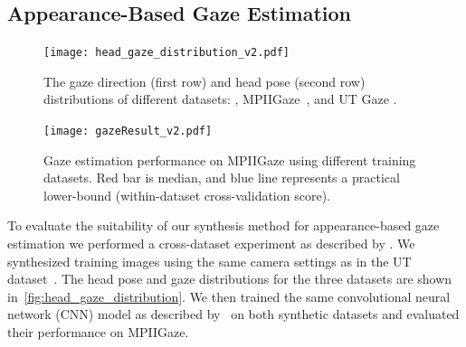 
\subsection{Appearance-Based Gaze Estimation}




\begin{figure}
    \centering
    \texttt{[image: head\_gaze\_distribution\_v2.pdf]}
    \caption{The gaze direction (first row) and head pose (second row) distributions of different datasets: \dataset, MPIIGaze~\cite{zhang15_cvpr}, and UT Gaze \cite{sugano2014learning}.}
    \label{fig:head_gaze_distribution}
\end{figure}

\begin{figure}
    \centering
    \texttt{[image: gazeResult\_v2.pdf]}
    \caption{Gaze estimation performance on MPIIGaze using different training datasets. Red bar is median, and blue line represents a practical lower-bound (within-dataset cross-validation score).}
    \label{fig:gazeResult}
\end{figure}

To evaluate the suitability of our synthesis method for appearance-based gaze estimation we performed a cross-dataset experiment as described by \citet{zhang15_cvpr}.
We synthesized training images using the same camera settings as in the UT dataset~\cite{sugano2014learning}.
The head pose and gaze distributions for the three datasets are shown in~\autoref{fig:head_gaze_distribution}.
We then trained the same convolutional neural network (CNN) model as described by~\citet{zhang15_cvpr} on both synthetic datasets and evaluated their performance on MPIIGaze.

